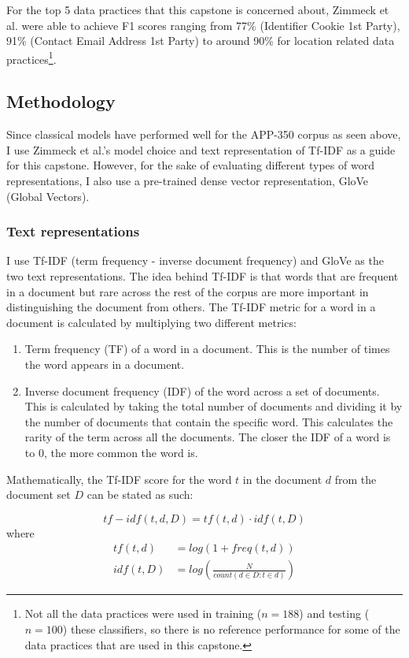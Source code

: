 For the top 5 data practices that this capstone is concerned about, Zimmeck et al. were able to achieve F1 scores ranging from 77\% (Identifier Cookie 1st Party), 91\% (Contact Email Address 1st Party) to around 90\% for location related data practices\footnote{Not all the data practices were used in training ($n = 188$) and testing ($n = 100$) these classifiers, so there is no reference performance for some of the data practices that are used in this capstone.}.

\subsection{Methodology}
Since classical models have performed well for the APP-350 corpus as seen above, I use Zimmeck et al.'s model choice and text representation of Tf-IDF as a guide for this capstone. However, for the sake of evaluating different types of word representations, I also use a pre-trained dense vector representation, GloVe (Global Vectors). 

\subsubsection{Text representations}
I use Tf-IDF (term frequency - inverse document frequency) and GloVe as the two text representations. The idea behind Tf-IDF is that words that are frequent in a document but rare across the rest of the corpus are more important in distinguishing the document from others. The Tf-IDF metric for a word in a document is calculated by multiplying two different metrics:

\begin{enumerate}
	\item Term frequency (TF) of a word in a document. This is the number of times the word appears in a document.
	\item Inverse document frequency (IDF) of the word across a set of documents. This is calculated by taking the total number of documents and dividing it by the number of documents that contain the specific word. This calculates the rarity of the term across all the documents. The closer the IDF of a word is to 0, the more common the word is.
\end{enumerate}

Mathematically, the Tf-IDF score for the word $t$ in the document $d$ from the document set $D$ can be stated as such:

\[tf-idf(t, d, D) = tf(t, d) \cdot idf(t, D)\]
where 
\begin{align*}
	tf(t, d) &= log(1 + freq(t, d )) \\
	idf(t, D) &= log\left(\frac{N}{count(d \in D : t \in d)}\right)
\end{align*}

